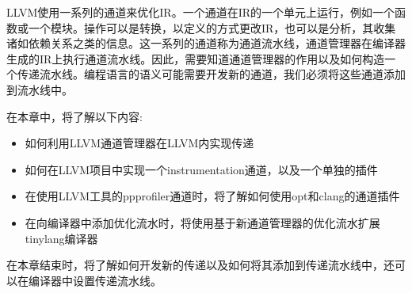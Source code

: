 
LLVM使用一系列的通道来优化IR。一个通道在IR的一个单元上运行，例如一个函数或一个模块。操作可以是转换，以定义的方式更改IR，也可以是分析，其收集诸如依赖关系之类的信息。这一系列的通道称为通道流水线，通道管理器在编译器生成的IR上执行通道流水线。因此，需要知道通道管理器的作用以及如何构造一个传递流水线。编程语言的语义可能需要开发新的通道，我们必须将这些通道添加到流水线中。

在本章中，将了解以下内容:

\begin{itemize}
\item
如何利用LLVM通道管理器在LLVM内实现传递

\item
如何在LLVM项目中实现一个instrumentation通道，以及一个单独的插件

\item
在使用LLVM工具的ppprofiler通道时，将了解如何使用opt和clang的通道插件

\item
在向编译器中添加优化流水时，将使用基于新通道管理器的优化流水扩展tinylang编译器
\end{itemize}

在本章结束时，将了解如何开发新的传递以及如何将其添加到传递流水线中，还可以在编译器中设置传递流水线。